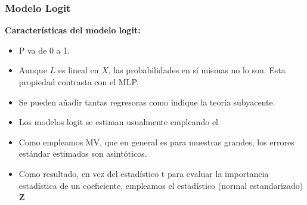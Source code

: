 \documentclass[10pt]{beamer}
\begin{document}



\begin{frame}
\frametitle{Modelo Logit}

\textbf{Características del modelo logit:}

\vspace{4mm}

\begin{itemize}
\item P va de 0 a 1. \\

\item Aunque $L$ es lineal en $X$, las probabilidades en sí mismas no lo son. Esta propiedad contrasta con el MLP.

\item Se pueden añadir tantas regresoras como indique la teoría subyacente.

\item Los modelos logit se estiman usualmente empleando el 

\item Como empleamos MV, que en general es para muestras grandes, los errores estándar estimados son asintóticos. 

\item Como resultado, en vez del estadístico t para evaluar la importancia estadística de un coeficiente, empleamos el estadístico (normal estandarizado) \textbf{Z}

\end{itemize}


\end{frame}


\end{document}
